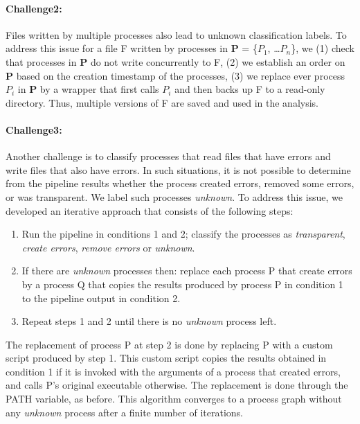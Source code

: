 \documentclass{article}
\begin{document}
\paragraph{Challenge2:} Files written by multiple processes also lead to unknown classification 
labels. To address this issue for a file F written by processes in 
\textbf{P} = \{$P_{1}$, \ldots $P_{n}$\}, we (1) check that processes 
in \textbf{P} do not write concurrently to F, (2) we establish an order 
on \textbf{P} based on the creation timestamp of the processes, (3) we 
replace ever process $P_{i}$ in \textbf{P} by a wrapper that first 
calls $P_{i}$ and then backs up F to a read-only directory. Thus, 
multiple versions of F are saved and used in the analysis.

\paragraph{Challenge3:} Another challenge is to classify processes that read files that have
errors and write files that also have errors. In such situations, it
is not possible to determine from the pipeline results whether
the process created errors, removed some errors, or was
transparent. We label such processes \emph{unknown}. To address this issue, we developed an iterative approach that consists of the following steps:
\begin{enumerate}
  \item Run the pipeline in conditions 1 and 2; classify the
    processes as \emph{transparent}, \emph{create errors},
    \emph{remove errors} or \emph{unknown}.
  \item If there are \emph{unknown} processes then: replace each process P that create errors by a process Q that
    copies the results produced by process P in condition 1 to the pipeline output in condition 2.
  \item Repeat steps 1 and 2 until there is no \emph{unknown} process left.
\end{enumerate}

The replacement of process P at step 2 is done by replacing P
with a custom script produced by step 1. This custom script
copies the results obtained in condition 1 if it is invoked with the
arguments of a process that created errors, and calls P's original
executable otherwise. The replacement is done through the PATH variable, as before.
This algorithm converges to a process graph without any \emph{unknown} process after
a finite number of iterations.
\end{document}
